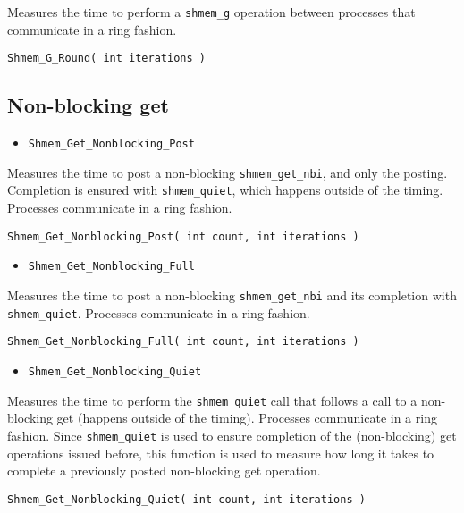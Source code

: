 \documentclass[12pt, letterpaper]{article}
\begin{document}
Measures the time to perform a {\tt shmem\_g} operation between processes that communicate in a ring fashion. 

\begin{lstlisting}
Shmem_G_Round( int iterations ) 
\end{lstlisting}

\subsection{Non-blocking get}

\begin{itemize}
    \item {\tt Shmem\_Get\_Nonblocking\_Post}
\end{itemize}

Measures the time to post a non-blocking {\tt shmem\_get\_nbi}, and only the posting. Completion is ensured with {\tt shmem\_quiet}, which happens outside of the timing. Processes communicate in a ring fashion.

\begin{lstlisting}
Shmem_Get_Nonblocking_Post( int count, int iterations )
\end{lstlisting}

\begin{itemize}
    \item {\tt Shmem\_Get\_Nonblocking\_Full}
\end{itemize}

Measures the time to post a non-blocking {\tt shmem\_get\_nbi} and its completion with {\tt shmem\_quiet}. Processes communicate in a ring fashion.

\begin{lstlisting}
Shmem_Get_Nonblocking_Full( int count, int iterations )
\end{lstlisting}

\begin{itemize}
    \item {\tt Shmem\_Get\_Nonblocking\_Quiet}
\end{itemize}

Measures the time to perform the {\tt shmem\_quiet} call that follows a call to a non-blocking get (happens outside of the timing). Processes communicate in a ring fashion. Since {\tt shmem\_quiet} is used to ensure completion of the (non-blocking) get operations issued before, this function is used to measure how long it takes to complete a previously posted non-blocking get operation.

\begin{lstlisting}
Shmem_Get_Nonblocking_Quiet( int count, int iterations )
\end{lstlisting}
\end{document}
